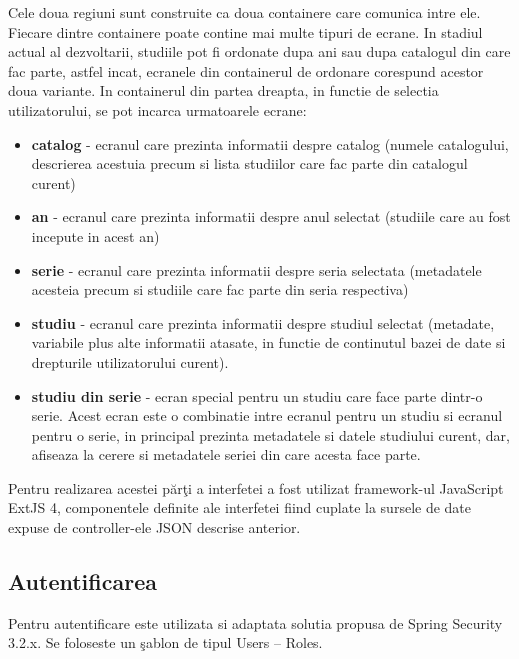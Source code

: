 \documentclass[a4paper, 10pt]{article}
\begin{document}
{\medskip

Cele doua regiuni sunt construite ca doua containere care comunica intre ele. Fiecare dintre containere poate contine
mai multe tipuri de ecrane. In stadiul actual al dezvoltarii, studiile pot fi ordonate dupa ani sau dupa catalogul din
care fac parte, astfel incat, ecranele din containerul de ordonare corespund acestor doua variante. In containerul din
partea dreapta, in functie de selectia utilizatorului, se pot incarca urmatoarele ecrane:

\begin{itemize}
\item
{\textbf{catalog}}
- ecranul care prezinta informatii despre catalog (numele catalogului, descrierea acestuia precum si lista
studiilor care fac parte din catalogul curent)
\item
{\textbf{an}}
- ecranul care prezinta informatii despre anul selectat (studiile care au fost incepute in acest an)
\item
{\textbf{serie}}
- ecranul care prezinta informatii despre seria selectata (metadatele acesteia precum si studiile care fac parte
din seria respectiva)
\item 
{\textbf{studiu}}
- ecranul care prezinta informatii despre studiul selectat (metadate, variabile plus alte informatii atasate, in
functie de continutul bazei de date si drepturile utilizatorului curent).
\item
{\textbf{studiu din serie}}
- ecran special pentru un studiu care face parte dintr-o serie. Acest ecran este o combinatie intre
ecranul pentru un studiu si ecranul pentru o serie, in principal prezinta metadatele si datele studiului curent, dar,
afiseaza la cerere si metadatele seriei din care acesta face parte.
\end{itemize}

\medskip

Pentru realizarea acestei p\u{a}r\c{t}i a interfetei a fost utilizat framework-ul JavaScript ExtJS 4,
componentele definite ale interfetei fiind cuplate la sursele de date expuse de controller-ele JSON descrise anterior.

\medskip

\subsection*{Autentificarea}

\medskip

Pentru autentificare este utilizata si adaptata solutia propusa de Spring Security 3.2.x.
Se foloseste un \c{s}ablon de tipul Users -- Roles.

}
\end{document}
